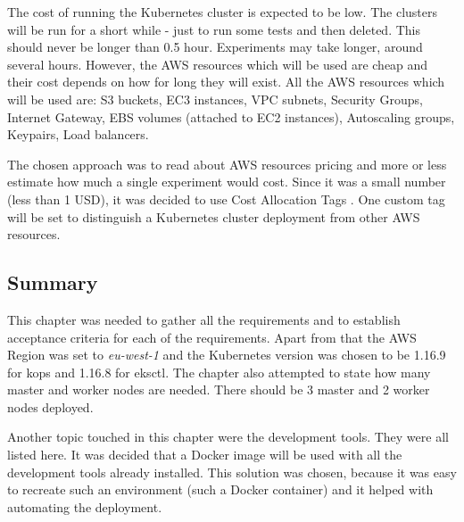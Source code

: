 The cost of running the Kubernetes cluster is expected to be low. The clusters will be run for a short while - just to run some tests and then deleted. This should never be longer than 0.5 hour. Experiments may take longer, around several hours. However, the AWS resources which will be used are cheap and their cost depends on how for long they will exist. All the AWS resources which will be used are: S3 buckets, EC3 instances, VPC subnets, Security Groups, Internet Gateway, EBS volumes (attached to EC2 instances), Autoscaling groups, Keypairs, Load balancers.

The chosen approach was to read about AWS resources pricing and more or less estimate how much a single experiment would cost. Since it was a small number (less than 1 USD), it was decided to use Cost Allocation Tags \cite{amazon-cost-tags}. One custom tag will be set to distinguish a Kubernetes cluster deployment from other AWS resources.

\subsection{Summary}

This chapter was needed to gather all the requirements and to establish acceptance criteria for each of the requirements. Apart from that the AWS Region was set to \textit{eu-west-1} and the Kubernetes version was chosen to be 1.16.9 for kops and 1.16.8 for eksctl. The chapter also attempted to state how many master and worker nodes are needed. There should be 3 master and 2 worker nodes deployed.

Another topic touched in this chapter were the development tools. They were all listed here. It was decided that a Docker image will be used with all the development tools already installed. This solution was chosen, because it was easy to recreate such an environment (such a Docker container) and it helped with automating the deployment.
